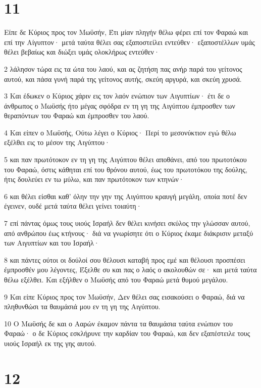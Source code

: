 \chapter{11}

\par Είπε δε Κύριος προς τον Μωϋσήν, Έτι μίαν πληγήν θέλω φέρει επί τον Φαραώ και επί την Αίγυπτον· μετά ταύτα θέλει σας εξαποστείλει εντεύθεν· εξαποστέλλων υμάς θέλει βεβαίως και διώξει υμάς ολοκλήρως εντεύθεν·
\par 2 λάλησον τώρα εις τα ώτα του λαού, και ας ζητήση πας ανήρ παρά του γείτονος αυτού, και πάσα γυνή παρά της γείτονος αυτής, σκεύη αργυρά, και σκεύη χρυσά.
\par 3 Και έδωκεν ο Κύριος χάριν εις τον λαόν ενώπιον των Αιγυπτίων· έτι δε ο άνθρωπος ο Μωϋσής ήτο μέγας σφόδρα εν τη γη της Αιγύπτου έμπροσθεν των θεραπόντων του Φαραώ και έμπροσθεν του λαού.
\par 4 Και είπεν ο Μωϋσής, Ούτω λέγει ο Κύριος· Περί το μεσονύκτιον εγώ θέλω εξέλθει εις το μέσον της Αιγύπτου·
\par 5 και παν πρωτότοκον εν τη γη της Αιγύπτου θέλει αποθάνει, από του πρωτοτόκου του Φαραώ, όστις κάθηται επί του θρόνου αυτού, έως του πρωτοτόκου της δούλης, ήτις δουλεύει εν τω μύλω, και παν πρωτότοκον των κτηνών·
\par 6 και θέλει είσθαι καθ' όλην την γην της Αιγύπτου κραυγή μεγάλη, οποία ποτέ δεν έγεινεν, ουδέ μετά ταύτα θέλει γείνει τοιαύτη·
\par 7 επί πάντας όμως τους υιούς Ισραήλ δεν θέλει κινήσει σκύλος την γλώσσαν αυτού, από ανθρώπου έως κτήνους· διά να γνωρίσητε ότι ο Κύριος έκαμε διάκρισιν μεταξύ των Αιγυπτίων και του Ισραήλ·
\par 8 και πάντες ούτοι οι δούλοί σου θέλουσι καταβή προς εμέ και θέλουσι προσπέσει έμπροσθέν μου λέγοντες, Έξελθε συ και πας ο λαός ο ακολουθών σε· και μετά ταύτα θέλω εξέλθει. Και εξήλθεν ο Μωϋσής από του Φαραώ μετά θυμού μεγάλου.
\par 9 Και είπε Κύριος προς τον Μωϋσήν, Δεν θέλει σας εισακούσει ο Φαραώ, διά να πληθυνθώσι τα θαυμάσιά μου εν τη γη της Αιγύπτου.
\par 10 Ο Μωϋσής δε και ο Ααρών έκαμον πάντα τα θαυμάσια ταύτα ενώπιον του Φαραώ· ο δε Κύριος εσκλήρυνε την καρδίαν του Φαραώ, και δεν εξαπέστειλε τους υιούς Ισραήλ εκ της γης αυτού.

\chapter{12}

